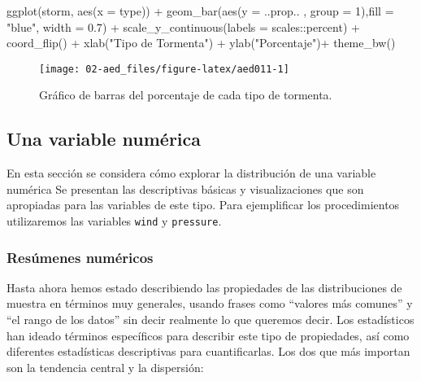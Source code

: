 \documentclass[
]{book}
\newenvironment{Shaded}{\begin{snugshade}}{\end{snugshade}}
\newcommand{\AttributeTok}[1]{\textcolor[rgb]{0.77,0.63,0.00}{#1}}
\newcommand{\DecValTok}[1]{\textcolor[rgb]{0.00,0.00,0.81}{#1}}
\newcommand{\FloatTok}[1]{\textcolor[rgb]{0.00,0.00,0.81}{#1}}
\newcommand{\FunctionTok}[1]{\textcolor[rgb]{0.00,0.00,0.00}{#1}}
\newcommand{\NormalTok}[1]{#1}
\newcommand{\SpecialCharTok}[1]{\textcolor[rgb]{0.00,0.00,0.00}{#1}}
\newcommand{\StringTok}[1]{\textcolor[rgb]{0.31,0.60,0.02}{#1}}
\begin{document}
\begin{Shaded}
\begin{Highlighting}[]
\FunctionTok{ggplot}\NormalTok{(storm, }\FunctionTok{aes}\NormalTok{(}\AttributeTok{x =}\NormalTok{ type)) }\SpecialCharTok{+} 
  \FunctionTok{geom\_bar}\NormalTok{(}\FunctionTok{aes}\NormalTok{(}\AttributeTok{y =}\NormalTok{ ..prop.. , }\AttributeTok{group =} \DecValTok{1}\NormalTok{),}\AttributeTok{fill =} \StringTok{"blue"}\NormalTok{, }\AttributeTok{width =} \FloatTok{0.7}\NormalTok{) }\SpecialCharTok{+} 
  \FunctionTok{scale\_y\_continuous}\NormalTok{(}\AttributeTok{labels =}\NormalTok{ scales}\SpecialCharTok{::}\NormalTok{percent) }\SpecialCharTok{+}
  \FunctionTok{coord\_flip}\NormalTok{() }\SpecialCharTok{+} 
  \FunctionTok{xlab}\NormalTok{(}\StringTok{"Tipo de Tormenta"}\NormalTok{) }\SpecialCharTok{+} \FunctionTok{ylab}\NormalTok{(}\StringTok{"Porcentaje"}\NormalTok{)}\SpecialCharTok{+}
  \FunctionTok{theme\_bw}\NormalTok{() }
\end{Highlighting}
\end{Shaded}

\begin{figure}

{\centering \texttt{[image: 02-aed\_files/figure-latex/aed011-1]} 

}

\caption{Gráfico de barras del porcentaje de cada tipo de tormenta.}\label{fig:aed011}
\end{figure}

\hypertarget{una-variable-numuxe9rica}{%
\subsection{Una variable numérica}\label{una-variable-numuxe9rica}}

En esta sección se considera cómo explorar la distribución de una variable numérica Se presentan las descriptivas básicas y visualizaciones que son apropiadas para las variables de este tipo. Para ejemplificar los procedimientos utilizaremos las variables \texttt{wind} y \texttt{pressure}.

\hypertarget{resuxfamenes-numuxe9ricos-1}{%
\subsubsection{Resúmenes numéricos}\label{resuxfamenes-numuxe9ricos-1}}

Hasta ahora hemos estado describiendo las propiedades de las distribuciones de muestra en términos muy generales, usando frases como ``valores más comunes'' y ``el rango de los datos'' sin decir realmente lo que queremos decir. Los estadísticos han ideado términos específicos para describir este tipo de propiedades, así como diferentes estadísticas descriptivas para cuantificarlas. Los dos que más importan son la tendencia central y la dispersión:
\end{document}
